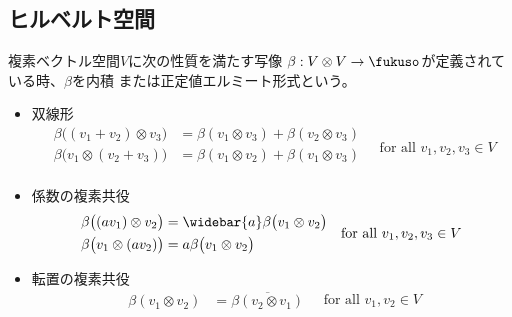\subsection{ヒルベルト空間}\label{s2:ヒルベルト空間} %
	\begin{definition}[内積]\label{def:内積} %
		複素ベクトル空間$V$に次の性質を満たす写像
		$\beta:V\otimes V\to \fukuso$が定義されている時、$\beta$を内積
		または正定値エルミート形式という。
		\begin{itemize}\setlength{\itemsep}{-1mm} %
			\item 双線形
			\begin{equation*}\begin{split} %
				\beta\bigl((v_1+v_2)\otimes v_3\bigr) 
				& = \beta(v_1\otimes v_3) + \beta(v_2\otimes v_3) \\
				\beta\bigl(v_1\otimes(v_2 + v_3)\bigr)
				& = \beta(v_1\otimes v_2) + \beta(v_1\otimes v_3) \\
			\end{split}
			\quad\text{for all }v_1,v_2,v_3\in V
			\end{equation*} %
			\item 係数の複素共役
			\begin{equation*}\begin{split} %
				\beta\bigl((av_1)\otimes v_2\bigr)
				&= \widebar{a}\beta\bigl(v_1\otimes v_2\bigr) \\
				\beta\bigl(v_1\otimes (av_2)\bigr)
				&= a\beta\bigl(v_1\otimes v_2\bigr) \\
			\end{split}
			\quad\text{for all }v_1,v_2,v_3\in V
			\end{equation*} %
			\item 転置の複素共役
			\begin{equation*}\begin{split} %
				\beta(v_1\otimes v_2)
				&= \overline{\beta(v_2\otimes v_1)}
			\end{split}
			\quad\text{for all }v_1,v_2\in V
			\end{equation*} %
		\end{itemize} %
	\end{definition} %

